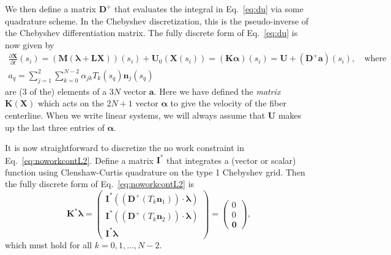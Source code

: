 We then define a matrix $\bm{D}^{+}$ that evaluates the integral in Eq.\ \eqref{eq:du} via some quadrature scheme. In the Chebyshev discretization, this is the pseudo-inverse of the Chebyshev differentiation matrix. The fully discrete form of Eq.\ \eqref{eq:du} is now given by
\begin{gather}
\label{eq:dvel}
\frac{\partial \bm{X}}{\partial t}\left(s_i\right)=  \left(\bm{M}(\bm{\lambda} +\bm{L}\bm{X})\right)(s_i) +\bm{U}_0(\bm{X}(s_i))= \left(\bm{K}\bm{\alpha}\right)(s_i) = \bm{U} +\left(\bm{D}^+ \bm{a}\right)(s_i), \quad \textrm{where} \\[4 pt] a_q= \sum_{j=1}^2\sum_{k=0}^{N-2} \alpha_{jk} T_k(s_q) \bm{n}_j(s_q)
\end{gather}
are (3 of the) elements of a $3N$ vector $\bm{a}$. Here we have defined the \textit{matrix} $\bm{K}(\bm{X})$ which acts on the $2N+1$ vector $\bm{\alpha}$ to give the velocity of the fiber centerline. When we write linear systems, we will always assume that $\bm{U}$ makes up the last three entries of $\bm{\alpha}$.

It is now straightforward to discretize the no work constraint in Eq.\ \eqref{eq:noworkcontL2}. Define a matrix $\bm{I}^*$ that integrates a (vector or scalar) function using Clenshaw-Curtis quadrature on the type 1 Chebyshev grid. Then the fully discrete form of Eq.\ \eqref{eq:noworkcontL2} is 
\begin{equation}
\label{eq:noworkcontFD}
\bm{K}^* \bm{\lambda}=\begin{pmatrix} \bm{I}^* \left(\left(\bm{D}^+(T_k \bm{n}_1)\right) \cdot \bm{\lambda}\right) \\[2 pt] \bm{I}^* \left(\left(\bm{D}^+(T_k \bm{n}_2)\right) \cdot \bm{\lambda}\right)\\[2 pt] \bm{I}^*\bm{\lambda} \end{pmatrix} = \begin{pmatrix} 0 \\[2 pt] 0\\[2 pt] \bm{0}\end{pmatrix},
\end{equation}
which must hold for all $k=0, 1, \dots, N-2$. 

